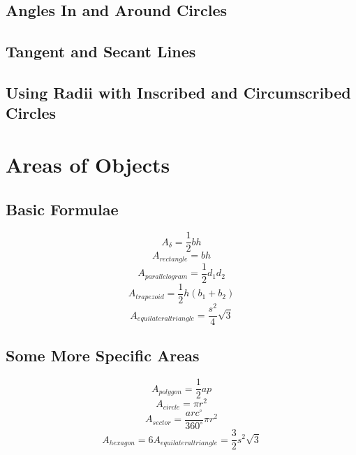 \documentclass[draft, letterpaper, 12pt]{article}
\begin{document}
	\subsection{Angles In and Around Circles}\label{sec: properties of arcs and angles of tangent and secant lines}
	\subsection{Tangent and Secant Lines}\label{sec: properties of the lengths of tangent and secant lines}
	\subsection{Using Radii with Inscribed and Circumscribed Circles}\label{sec: special formulae that involve triangles and circles}
\section{Areas of Objects}
	\subsection{Basic Formulae}\label{sec: basic area formulae}
		\begin{equation}
			A_{\delta} = \frac{1}{2}bh
		\end{equation}
		\begin{equation}
			A_{rectangle} = bh
		\end{equation}
		\begin{equation}
			A_{parallelogram} = \frac{1}{2}d_1d_2
		\end{equation}
		\begin{equation}
			A_{trapezoid} = \frac{1}{2}h\left(b_1 + b_2\right)
		\end{equation}
		\begin{equation}
			A_{equilateral triangle} = \frac{s^2}{4}\sqrt{3}
		\end{equation}
	\subsection{Some More Specific Areas}\label{sec: some interesting area formulae}
		\begin{equation}
			A_{polygon} = \frac{1}{2}ap
		\end{equation}
		\begin{equation}
			A_{circle} = \pi r^2
		\end{equation}
		\begin{equation}
			A_{sector} = \frac{arc ^{\circ}}{360^{\circ}}\pi r^2
		\end{equation}
		\begin{equation}
			A_{hexagon} = 6A_{equilateral triangle} = \frac{3}{2}s^2\sqrt{3}
		\end{equation}
\end{document}
